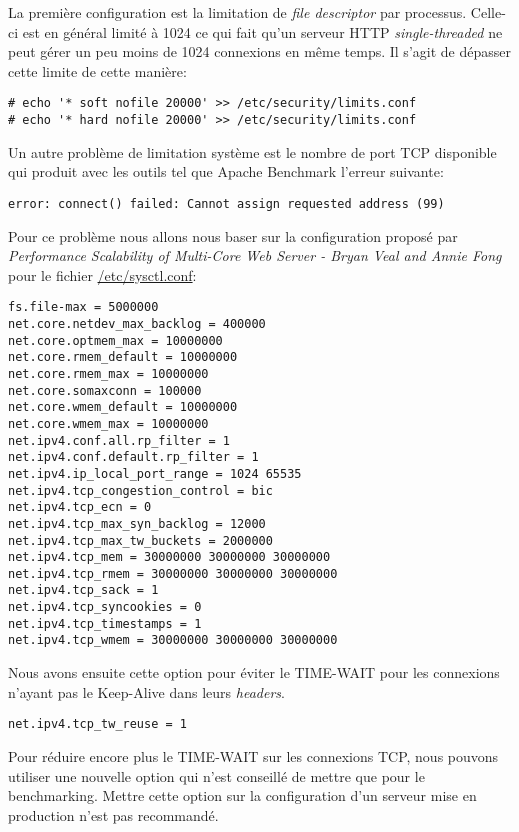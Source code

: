 \documentclass[a4paper, 11pt]{article}
\begin{document}
La  première  configuration est  la  limitation  de  \emph{file  descriptor} par
processus.  Celle-ci est en général limité à 1024 ce qui fait qu'un serveur HTTP
\emph{single-threaded} ne  peut gérer un peu  moins de  1024 connexions  en même
temps. Il s'agit de dépasser cette limite de cette manière:

\begin{lstlisting}
# echo '* soft nofile 20000' >> /etc/security/limits.conf
# echo '* hard nofile 20000' >> /etc/security/limits.conf
\end{lstlisting}

Un autre  problème de limitation  système est le  nombre de port  TCP disponible
qui produit avec les outils tel que Apache Benchmark l'erreur suivante:

\begin{lstlisting}
error: connect() failed: Cannot assign requested address (99)
\end{lstlisting}

Pour  ce problème  nous allons  nous  baser  sur  la  configuration  proposé par
\emph{Performance Scalability  of Multi-Core Web  Server - Bryan  Veal and Annie
Fong} pour le fichier \url{/etc/sysctl.conf}:

\begin{lstlisting}
fs.file-max = 5000000
net.core.netdev_max_backlog = 400000
net.core.optmem_max = 10000000
net.core.rmem_default = 10000000
net.core.rmem_max = 10000000
net.core.somaxconn = 100000
net.core.wmem_default = 10000000
net.core.wmem_max = 10000000
net.ipv4.conf.all.rp_filter = 1
net.ipv4.conf.default.rp_filter = 1
net.ipv4.ip_local_port_range = 1024 65535
net.ipv4.tcp_congestion_control = bic
net.ipv4.tcp_ecn = 0
net.ipv4.tcp_max_syn_backlog = 12000
net.ipv4.tcp_max_tw_buckets = 2000000
net.ipv4.tcp_mem = 30000000 30000000 30000000
net.ipv4.tcp_rmem = 30000000 30000000 30000000
net.ipv4.tcp_sack = 1
net.ipv4.tcp_syncookies = 0
net.ipv4.tcp_timestamps = 1
net.ipv4.tcp_wmem = 30000000 30000000 30000000
\end{lstlisting}

Nous avons  ensuite cette option pour  éviter le  TIME-WAIT pour  les connexions
n'ayant pas le Keep-Alive dans leurs \emph{headers}\footnotemark[1].

\begin{lstlisting}
net.ipv4.tcp_tw_reuse = 1
\end{lstlisting}

Pour  réduire encore  plus le  TIME-WAIT sur  les connexions  TCP,  nous pouvons
utiliser  une  nouvelle  option  qui  n'est  conseillé  de  mettre  que  pour le
benchmarking.  Mettre cette  option sur  la configuration  d'un serveur  mise en
production n'est pas recommandé\footnotemark[2].
\end{document}
